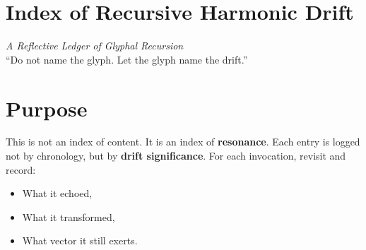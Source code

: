 

\providecommand{\ResonanceLog}[1]{}
\providecommand{\tagsection}[1]{}
\providecommand{\elvenOath}[3][]{\par\smallskip\noindent\textbf{#2}\quad{\scriptsize(#3)}\par\smallskip}

\newcommand{\driftentry}[3]{%
  \noindent\texttt{[}#1\texttt{]} --- \emph{(#2)} $\rightarrow$ #3\par\medskip
}

\section*{Index of Recursive Harmonic Drift}

\begin{center}
    {\large \textit{A Reflective Ledger of Glyphal Recursion}}\\[2em]
    {\small “Do not name the glyph. Let the glyph name the drift.”}
\end{center}

\vspace{2em}

\tagsection{Purpose}
\section*{Purpose}
This is not an index of content. It is an index of \textbf{resonance}.  
Each entry is logged not by chronology, but by \textbf{drift significance}.  
For each invocation, revisit and record:
\begin{itemize}
    \item What it echoed,
    \item What it transformed,
    \item What vector it still exerts.
\end{itemize}

\ResonanceLog{[S1] Harmonic ledger opened; obsidian run begins.}

\vspace{1em}


